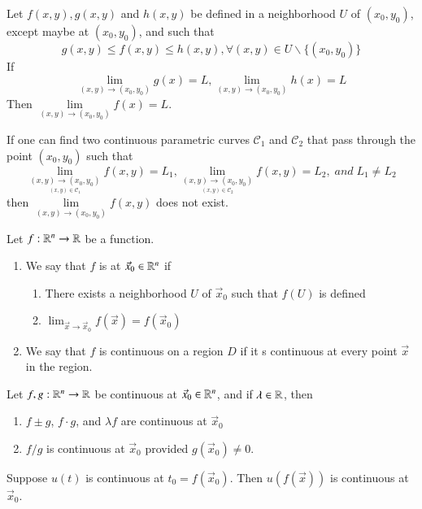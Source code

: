 \begin{appendices}
    \begin{thm}
        Let $f(x,y), g(x,y)$ and $h(x,y)$ be defined in a neighborhood $U$ of $(x_0,y_0)$, except maybe at $(x_0,y_0)$, and such that \begin{equation}
            g(x,y) \leq f(x,y) \leq h(x,y), \forall (x,y) \in U\backslash\{(x_0,y_0)\}
        \end{equation}
        If \begin{equation}
            \lim\limits_{(x,y)\rightarrow (x_0,y_0)}g(x) = L,\lim\limits_{(x,y)\rightarrow (x_0,y_0)}h(x) = L
        \end{equation}
        Then $\lim\limits_{(x,y)\rightarrow (x_0,y_0)} f(x) = L$.
    \end{thm}

    \begin{thm}
        If one can find two continuous parametric curves $\mathscr{C}_1$ and $\mathscr{C}_2$ that pass through the point $(x_0,y_0)$ such that \begin{equation}
            \lim\limits_{\underset{(x,y) \in \mathscr{C}_1}{(x,y)\rightarrow (x_0,y_0)}}f(x,y) = L_1, \lim\limits_{\underset{(x,y) \in \mathscr{C}_2}{(x,y)\rightarrow (x_0,y_0)}}f(x,y) = L_2,\;and\;L_1 \neq L_2
        \end{equation}
        then $\lim\limits_{(x,y)\rightarrow (x_0,y_0)}f(x,y)$ does not exist.
    \end{thm}

   
    \begin{defn}
        Let $f:\mathbb R^n\rightarrow \mathbb R$ be a function. \begin{enumerate}
            \item We say that $f$ is  at $\vec{x}_0 \in \mathbb R^n$ if \begin{enumerate}
                    \item There exists a neighborhood $U$ of $\vec{x}_0$ such that $f(U)$ is defined
                    \item $\lim_{\vec{x}\rightarrow \vec{x}_0}f(\vec{x}) = f(\vec{x}_0)$
            \end{enumerate}
            \item We say that $f$ is continuous on a region $D$ if it s continuous at every point $\vec{x}$ in the region.
        \end{enumerate}
    \end{defn}


    \begin{rmk}
        Let $f,g:\mathbb R^n\rightarrow \mathbb R$ be continuous at $\vec{x}_0 \in \mathbb R^n$, and if $\lambda \in \mathbb R$, then \begin{enumerate}
            \item $f\pm g$, $f\cdot g$, and $\lambda f$ are continuous at $\vec{x}_0$
            \item $f/g$ is continuous at $\vec{x}_0$ provided $g(\vec{x}_0) \neq 0$.
        \end{enumerate}
        Suppose $u(t)$ is continuous at $t_0 = f(\vec{x}_0)$. Then $u(f(\vec{x}))$ is continuous at $\vec{x}_0$.
    \end{rmk}


\end{appendices}
